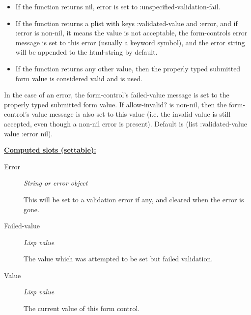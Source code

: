 \documentclass [11pt]{book}
\begin{document}
\begin{itemize}
\begin{description}
\begin{itemize}

\item  If the function returns nil, error is set to  :unspecified-validation-fail.

\item  If the function returns a plist with keys :validated-value and :error, and if :error is non-nil,
it means the value is not acceptable, the form-controls error message is set to this error (usually a keyword symbol),
and the error string will be appended to the html-string by default. 

\item  If the function returns any other value, then the properly typed submitted form value is considered valid and is used.


\end{itemize}


In the case of an error, the form-control's failed-value message is set to the properly typed submitted form value. If
allow-invalid? is non-nil, then the form-control's value message is also set to this value (i.e. the invalid value is
still accepted, even though a non-nil error is present).
Default is (list :validated-value value :error nil).




\end{description}






\textbf{
\underline{Computed slots (settable):}}

\begin{description}

\item [Error]
\emph{String or error object}

 This will be set to a validation error if any,
and cleared when the error is gone.




\item [Failed-value]
\emph{Lisp value}

 The value which was attempted to be set but failed validation.




\item [Value]
\emph{Lisp value}

 The current value of this form control.





\end{description}
\end{itemize}
\end{document}
